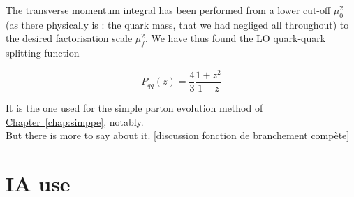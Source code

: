 \documentclass[a4paper,10pt]{report}
\newcommand{\chaplabel}{{Chapter}}
\newcommand{\chapref}[1]{\hyperref[#1]{\chaplabel~\ref*{#1}}}
\begin{document}
The transverse momentum integral has been performed from a lower cut-off $\mu_0^2$ (as there physically is : the quark mass, that 
we had negliged all throughout) to the desired factorisation scale $\mu_f^2$. We have thus found the LO 
quark-quark splitting function 

\begin{equation}
  P_{qq}(z) = \frac{4}{3}\frac{1 + z^2}{1 - z}
\end{equation}

It is the one used for the simple parton evolution method of \chapref{chap:simppe}, notably. \\ 
But there is more to say about it. [discussion fonction de branchement compète]

\newpage

\section*{IA use}

\printbibheading[heading=bibintoc]
\printbibliography[heading=subbibintoc, keyword={sourcebook}, title={Textbooks and lecture notes}]
\printbibliography[heading=subbibintoc, keyword={thesis}, title={Thesis}]
\printbibliography[heading=subbibintoc, keyword={article}, title={Articles}]
\printbibliography[heading=subbibintoc, prenote=specnote, keyword={addarticle}, title={Additional articles}]
\end{document}
